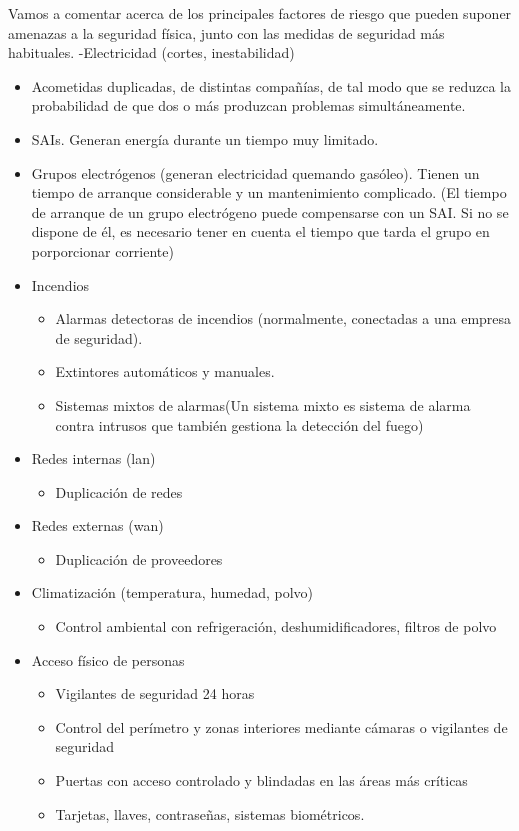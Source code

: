 \documentclass{article}
\begin{document}
Vamos a comentar acerca de los principales factores de riesgo que pueden suponer amenazas a la seguridad física, junto con las medidas de seguridad más habituales.
-Electricidad (cortes, inestabilidad)
\begin{itemize}
\item Acometidas duplicadas, de distintas compañías, de tal modo que se reduzca la probabilidad de que dos o más produzcan problemas simultáneamente.
\item SAIs. Generan energía durante un tiempo muy limitado.
\item Grupos electrógenos (generan electricidad quemando gasóleo). Tienen un tiempo de arranque considerable y un mantenimiento complicado.
(El tiempo de arranque de un grupo electrógeno puede compensarse con un SAI. Si no se dispone de él, es necesario tener en cuenta el tiempo que tarda el grupo en porporcionar corriente)
\end{itemize}
\begin{itemize}
\item Incendios
\begin{itemize}
\item Alarmas detectoras de incendios (normalmente, conectadas a una empresa de seguridad).
\item Extintores automáticos y manuales.
\item Sistemas mixtos de alarmas(Un sistema mixto es sistema de alarma contra intrusos que también gestiona la detección del fuego)
\end{itemize}
\item Redes internas (lan)
\begin{itemize}
\item Duplicación de redes
\end{itemize}
\item Redes externas (wan)
\begin{itemize}
\item Duplicación de proveedores
\end{itemize}
\item Climatización (temperatura, humedad, polvo)
\begin{itemize}
\item Control ambiental con refrigeración, deshumidificadores, filtros de polvo
\end{itemize}
\item Acceso físico de personas
\begin{itemize}
\item Vigilantes de seguridad 24 horas
\item Control del perímetro y zonas interiores mediante cámaras o vigilantes de seguridad
\item Puertas con acceso controlado y blindadas en las áreas más críticas
\item Tarjetas, llaves, contraseñas, sistemas biométricos.
\end{itemize}
\end{itemize}
\end{document}
